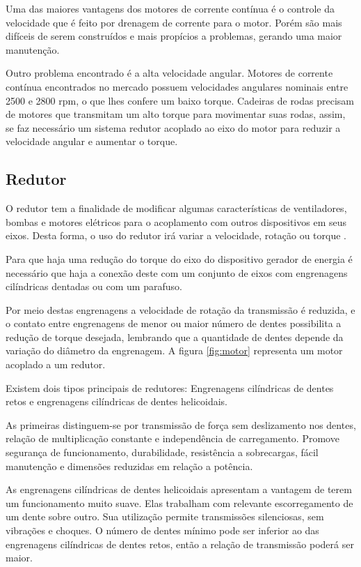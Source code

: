 Uma das maiores vantagens dos motores de corrente contínua é o controle da velocidade que é feito por drenagem de corrente para o motor. Porém são mais difíceis de serem construídos e mais propícios a problemas, gerando uma maior manutenção.

Outro problema encontrado é a alta velocidade angular. Motores de corrente contínua encontrados no mercado possuem velocidades angulares nominais entre 2500 e 2800 rpm, o que lhes confere um baixo torque. Cadeiras de rodas precisam de motores que transmitam um alto torque para movimentar suas rodas, assim, se faz necessário um sistema redutor acoplado ao eixo do motor para reduzir a velocidade angular e aumentar o torque.

\subsection{Redutor}

O redutor tem a finalidade de modificar algumas características de ventiladores, bombas e motores elétricos para o acoplamento com outros dispositivos em seus eixos. Desta forma, o uso do redutor irá variar a velocidade, rotação ou torque \cite{apresentacao_andrade}.

Para que haja uma redução do torque do eixo do dispositivo gerador de energia é necessário que haja a conexão deste com um conjunto de eixos com engrenagens cilíndricas dentadas ou com um parafuso.

Por meio destas engrenagens a velocidade de rotação da transmissão é reduzida, e o contato entre engrenagens de menor ou maior número de dentes possibilita a redução de torque desejada, lembrando que a quantidade de dentes depende da variação do diâmetro da engrenagem. A figura \ref{fig:motor} representa um motor acoplado a um redutor.

Existem dois tipos principais de redutores: Engrenagens cilíndricas de dentes retos e engrenagens cilíndricas de dentes helicoidais.

As primeiras distinguem-se por transmissão de força sem deslizamento nos dentes, relação de multiplicação constante e independência de carregamento. Promove segurança de funcionamento, durabilidade, resistência a sobrecargas, fácil manutenção e dimensões reduzidas em relação a potência.

As engrenagens cilíndricas de dentes helicoidais apresentam a vantagem de terem um funcionamento muito suave. Elas trabalham com relevante escorregamento de um dente sobre outro. Sua utilização permite transmissões silenciosas, sem vibrações e choques. O número de dentes mínimo pode ser inferior ao das engrenagens cilíndricas de dentes retos, então a relação de transmissão poderá ser maior.

